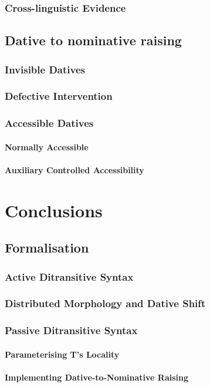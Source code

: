 \documentclass[11pt]{upenndiss}
\begin{document}
\section{Cross-linguistic Evidence}
\chapter{Dative to nominative raising}\label{ch:dative-to-nominative}
\section{Invisible Datives}
\section{Defective Intervention}
\section{Accessible Datives}
\subsection{Normally Accessible}
\subsection{Auxiliary Controlled Accessibility}
\part{Conclusions}
\chapter{Formalisation}\label{ch:formal}
\section{Active Ditransitive Syntax}
\section{Distributed Morphology and Dative Shift}
\section{Passive Ditransitive Syntax}
\subsection{Parameterising T's Locality}
\subsection{Implementing Dative-to-Nominative Raising}
\end{document}
